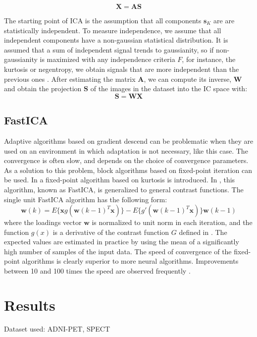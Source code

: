 \begin{equation}\label{eq:ica}
\mathbf{X}=\mathbf{A}\mathbf{S}
\end{equation}

The starting point of ICA is the assumption that all components $\mathbf{s}_K$ are are statistically independent. To measure independence, we assume that all independent components have a non-gaussian statistical distribution. It is assumed that a sum of independent signal trends to gaussianity, so if non-gaussianity is maximized with any independence criteria $F$, for instance, the kurtosis or negentropy, we obtain signals that are more independent than the previous ones \cite{Hyvarinen1999,Hyvarinen2000}.
After estimating the matrix $\mathbf{A}$, we can compute its inverse, $\mathbf{W}$ and obtain the projection $\mathbf{S}$ of the images in the dataset into the IC space with: 
\begin{equation}
\mathbf{S} = \mathbf{W}\mathbf{X}
\end{equation}

\subsection{FastICA}
Adaptive algorithms based on gradient descend can be problematic when they are used on an environment in which adaptation is not necessary, like this case. The convergence is often slow, and depends on the choice of convergence parameters. As a solution to this problem, block algorithms based on fixed-point iteration \cite{Oja1997,FastICA99} can be used. In \cite{Oja1997} a fixed-point algorithm based on kurtosis is introduced. In \cite{FastICA99}, this algorithm, known as FastICA, is generalized to general contrast functions. The single unit FastICA algorithm has the following form:
\begin{equation}
\mathbf{w}(k) = E\lbrace\mathbf{x}g(\mathbf{w}(k-1)^T\mathbf{x})\rbrace -E\lbrace g'(\mathbf{w}(k-1)^T\mathbf{x})\rbrace\mathbf{w}(k-1)
\end{equation}
where the loadings vector $\mathbf{w}$ is normalized to unit norm in each iteration, and the function $g(x)$ is a derivative of the contrast function $G$ defined in \cite{Hyvarinen1999}. The expected values are estimated in practice by using the mean of a significantly high number of samples of the input data. 
The speed of convergence of the fixed-point algorithms is clearly superior to more neural algorithms. Improvements between 10 and 100 times the speed are observed frequently \cite{Giannakopoulos1998}. 
\section{Results}
Dataset used: ADNI-PET, SPECT